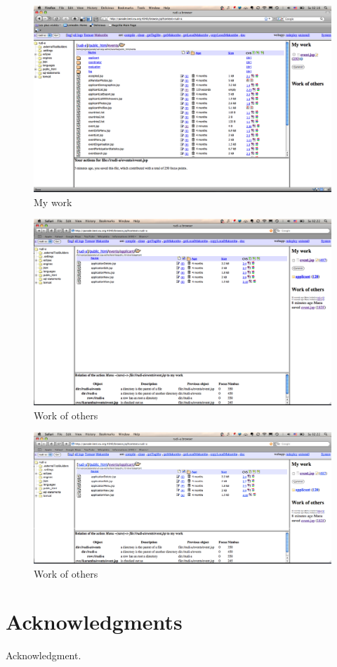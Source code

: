 \documentclass{ecscw2007}
\begin{document}
\begin{figure}[thb]
  \centering
  \includegraphics[width=.9\linewidth]{my-work}
  \caption{My work}
  \label{fig:my-work}
\end{figure}

\begin{figure}[thb]
  \centering
  \includegraphics[width=.9\linewidth]{work-others}
  \caption{Work of others}
  \label{fig:work-others}
\end{figure}

\begin{figure}[thb]
  \centering
  \includegraphics[width=.98\linewidth]{work-others-cropped}
  \caption{Work of others}
  \label{fig:work-others-cropped}
\end{figure}



\section*{Acknowledgments} 

{\footnotesize Acknowledgment. }




  
\end{document}
